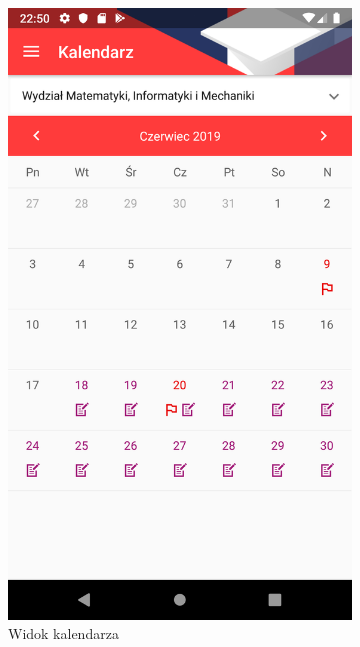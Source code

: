 \documentclass{pracamgr}
\begin{document}
\begin{figure}[p]
	\centering
	\begin{subfigure}[t]{0.3\textwidth}
		\includegraphics[width=\textwidth]{img/calendar_june19.png}
		\caption{Widok kalendarza}
		\label{fig:calendar_calendar}
	\end{subfigure}
	\quad
	\begin{subfigure}[t]{0.3\textwidth}

\end{subfigure}
\end{figure}
\end{document}

